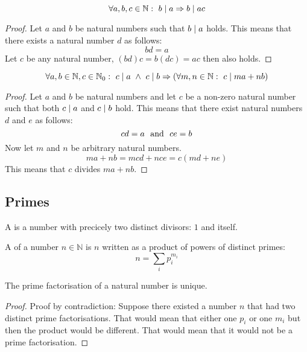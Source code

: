 \documentclass[main.tex]{subfiles}
\begin{document}
\begin{pr}
  \label{pr:divisor-also-divides-multiple}
  \[ \forall a, b, c \in \mathbb{N}:\ b \mid a \Rightarrow b \mid ac \]
  
  \begin{proof}
    Let $a$ and $b$ be natural numbers such that $b \mid a$ holds.
    This means that there exists a natural number $d$ as follows:
    \[ bd = a \]
    Let $c$ be any natural number, $(bd)c = b(dc) = ac$ then also holds.
  \end{proof}
\end{pr}

\begin{pr}
  \[ \forall a, b \in \mathbb{N}, c \in \mathbb{N}_{0}:\ c \mid a \ \wedge\  c \mid b \Rightarrow (\forall m, n \in \mathbb{N}:\ c \mid ma + nb) \]

  \begin{proof}
    Let $a$ and $b$ be natural numbers and let $c$ be a non-zero natural number such that both $c \mid a$ and $c \mid b$ hold.
    This means that there exist natural numbers $d$ and $e$ as follows:
    \[ cd = a \ \text{ and }\  ce = b \]
    Now let $m$ and $n$ be arbitrary natural numbers.
    \[ ma + nb = mcd + nce = c(md + ne) \]
    This means that $c$ divides $ma + nb$.
  \end{proof}
\end{pr}

\subsection{Primes}

\begin{de}
  \label{de:primes}
  A  is a number with precicely two distinct divisors: $1$ and itself.
\end{de}

\begin{de}
  A  of a number $n\in\mathbb{N}$ is $n$ written as a product of powers of distinct primes:
  \[ n = \sum_{i}p_{i}^{m_i} \]
\end{de}

\begin{pr}
  \label{pr:prime-factorisation-unique}
  The prime factorisation of a natural number is unique.

  \begin{proof}
    Proof by contradiction: Suppose there existed a number $n$ that had two distinct prime factorisations.
    That would mean that either one $p_{i}$ or one $m_{i}$ but then the product would be different.
    That would mean that it would not be a prime factorisation.
  \end{proof}
\end{pr}

\end{document}
